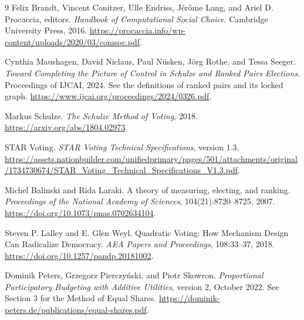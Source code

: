 \begin{thebibliography}{9}
Felix Brandt, Vincent Conitzer, Ulle Endriss, J\'er\^ome Lang, and Ariel D. Procaccia, editors.
\emph{Handbook of Computational Social Choice}. Cambridge University Press, 2016.
\url{https://procaccia.info/wp-content/uploads/2020/03/comsoc.pdf}.

Cynthia Maushagen, David Niclaus, Paul N\"usken, J\"org Rothe, and Tessa Seeger.
\emph{Toward Completing the Picture of Control in Schulze and Ranked Pairs Elections}.
Proceedings of IJCAI, 2024. See the definitions of ranked pairs and its locked graph.
\url{https://www.ijcai.org/proceedings/2024/0326.pdf}.

Markus Schulze. \emph{The Schulze Method of Voting}, 2018.
\url{https://arxiv.org/abs/1804.02973}.

STAR Voting. \emph{STAR Voting Technical Specifications}, version 1.3.
\url{https://assets.nationbuilder.com/unifiedprimary/pages/501/attachments/original/1734730674/STAR_Voting_Technical_Specifications_V1.3.pdf}.

Michel Balinski and Rida Laraki. A theory of measuring, electing, and ranking.
\emph{Proceedings of the National Academy of Sciences}, 104(21):8720--8725, 2007.
\url{https://doi.org/10.1073/pnas.0702634104}.

Steven P. Lalley and E. Glen Weyl. Quadratic Voting: How Mechanism Design Can Radicalize Democracy.
\emph{AEA Papers and Proceedings}, 108:33--37, 2018.
\url{https://doi.org/10.1257/pandp.20181002}.

Dominik Peters, Grzegorz Pierczy\'nski, and Piotr Skowron.
\emph{Proportional Participatory Budgeting with Additive Utilities}, version 2, October 2022.
See Section 3 for the Method of Equal Shares.
\url{https://dominik-peters.de/publications/equal-shares.pdf}.
\end{thebibliography}

